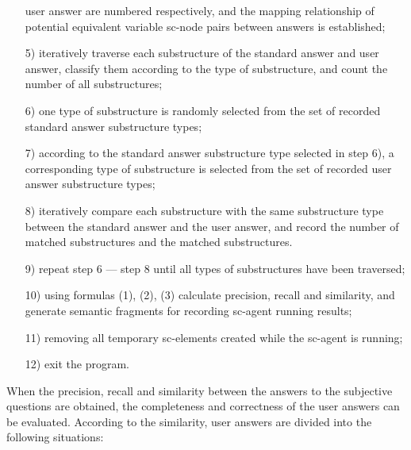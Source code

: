 \documentclass{report}
\begin{document}
\begin{small}

\begin{multicols}{2}


\begin{enumerate}
\item [] user answer are numbered respectively, and the mapping
relationship of potential equivalent variable sc-node pairs
between answers is established;
\item [5)]iteratively traverse each substructure of the standard
answer and user answer, classify them according to
the type of substructure, and count the number of all
substructures;
\item [6)]one type of substructure is randomly selected from the
set of recorded standard answer substructure types;
\item [7)]according to the standard answer substructure type selected in step 6), a corresponding type of substructure is
selected from the set of recorded user answer substructure types;
\item [8)] iteratively compare each substructure with the same substructure type between the standard answer and the user
answer, and record the number of matched substructures
and the matched substructures.
\item [9)]repeat step 6 — step 8 until all types of substructures
have been traversed;
\item [10)] using formulas (1), (2), (3) calculate precision, recall and
similarity, and generate semantic fragments for recording
sc-agent running results;
\item [11)] removing all temporary sc-elements created while the
sc-agent is running;
\item [12)] exit the program.
\end{enumerate} 

\par When the precision, recall and similarity between the answers to the subjective questions are obtained, the completeness
and correctness of the user answers can be evaluated. According
to the similarity, user answers are divided into the following
situations:


\end{multicols}
\end{small}
\end{document}
